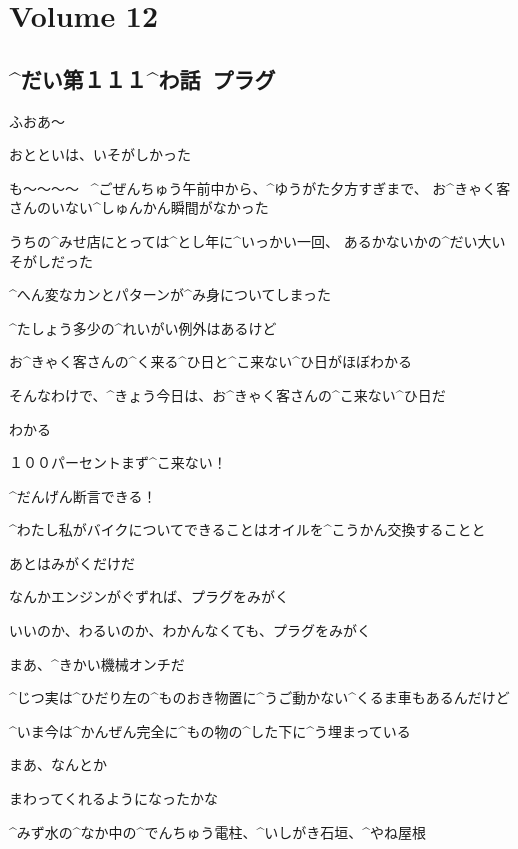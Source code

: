 \section{Volume 12}

\subsection{^{だい}{第}１１１^{わ}{話}\ プラグ}

\page[4]
\Alpha ふおあ〜

\Alpha おとといは、いそがしかった

\page
\Alpha も〜〜〜〜
\ ^{ごぜんちゅう}{午前中}から、^{ゆうがた}{夕方}すぎまで、
お^{きゃく}{客}さんのいない^{しゅんかん}{瞬間}がなかった

\Alpha うちの^{みせ}{店}にとっては^{とし}{年}に^{いっかい}{一回}、
あるかないかの^{だい}{大}いそがしだった

\Alpha ^{へん}{変}なカンとパターンが^{み}{身}についてしまった

\Alpha ^{たしょう}{多少}の^{れいがい}{例外}はあるけど

\Alpha お^{きゃく}{客}さんの^{く}{来}る^{ひ}{日}と^{こ}{来}ない^{ひ}{日}がほぼわかる

\page
\Alpha そんなわけで、^{きょう}{今日}は、お^{きゃく}{客}さんの^{こ}{来}ない^{ひ}{日}だ

\Alpha わかる

\Alpha １００パーセントまず^{こ}{来}ない！

\Alpha ^{だんげん}{断言}できる！

\page
\Alpha ^{わたし}{私}がバイクについてできることはオイルを^{こうかん}{交換}することと

\Alpha あとはみがくだけだ

\Alpha なんかエンジンがぐずれば、プラグをみがく

\Alpha いいのか、わるいのか、わかんなくても、プラグをみがく

\Alpha まあ、^{きかい}{機械}オンチだ

\Alpha ^{じつ}{実}は^{ひだり}{左}の^{ものおき}{物置}に^{うご}{動}かない^{くるま}{車}もあるんだけど

\Alpha ^{いま}{今}は^{かんぜん}{完全}に^{もの}{物}の^{した}{下}に^{う}{埋}まっている

\page[10]
\Alpha まあ、なんとか

\Alpha まわってくれるようになったかな

\page
\Alpha ^{みず}{水}の^{なか}{中}の^{でんちゅう}{電柱}、^{いしがき}{石垣}、^{やね}{屋根}

